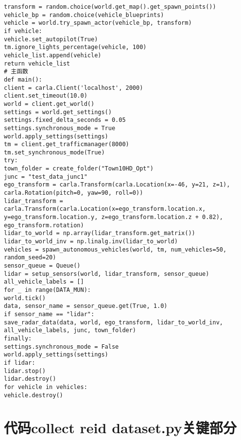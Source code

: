 \begin{lstlisting}
transform = random.choice(world.get_map().get_spawn_points())
vehicle_bp = random.choice(vehicle_blueprints)
vehicle = world.try_spawn_actor(vehicle_bp, transform)
if vehicle:
vehicle.set_autopilot(True)
tm.ignore_lights_percentage(vehicle, 100)
vehicle_list.append(vehicle)
return vehicle_list
# 主函数
def main():
client = carla.Client('localhost', 2000)
client.set_timeout(10.0)
world = client.get_world()
settings = world.get_settings()
settings.fixed_delta_seconds = 0.05
settings.synchronous_mode = True
world.apply_settings(settings)
tm = client.get_trafficmanager(8000)
tm.set_synchronous_mode(True)
try:
town_folder = create_folder("Town10HD_Opt")
junc = "test_data_junc1"
ego_transform = carla.Transform(carla.Location(x=-46, y=21, z=1), carla.Rotation(pitch=0, yaw=90, roll=0))
lidar_transform = carla.Transform(carla.Location(x=ego_transform.location.x, y=ego_transform.location.y, z=ego_transform.location.z + 0.82), ego_transform.rotation)
lidar_to_world = np.array(lidar_transform.get_matrix())
lidar_to_world_inv = np.linalg.inv(lidar_to_world)
vehicles = spawn_autonomous_vehicles(world, tm, num_vehicles=50, random_seed=20)
sensor_queue = Queue()
lidar = setup_sensors(world, lidar_transform, sensor_queue)
all_vehicle_labels = []
for _ in range(DATA_MUN):
world.tick()
data, sensor_name = sensor_queue.get(True, 1.0)
if sensor_name == "lidar":
save_radar_data(data, world, ego_transform, lidar_to_world_inv, all_vehicle_labels, junc, town_folder)
finally:
settings.synchronous_mode = False
world.apply_settings(settings)
if lidar:
lidar.stop()
lidar.destroy()
for vehicle in vehicles:
vehicle.destroy()
\end{lstlisting}

\section{代码collect reid dataset.py关键部分}

